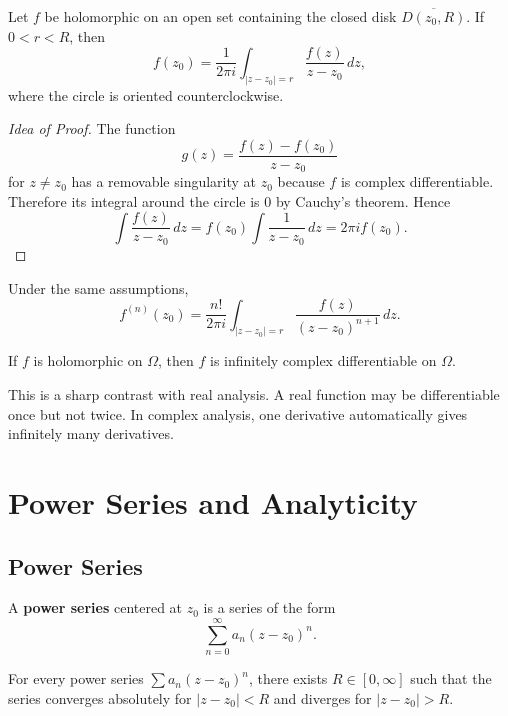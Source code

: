 \begin{theorem}
Let $f$ be holomorphic on an open set containing the closed disk $\overline{D(z_0,R)}$. If $0<r<R$, then
\[
    f(z_0)=\frac{1}{2\pi i}\int_{|z-z_0|=r}\frac{f(z)}{z-z_0}\,dz,
\]
where the circle is oriented counterclockwise.
\end{theorem}

\begin{proof}[Idea of Proof]
The function
\[
    g(z)=\frac{f(z)-f(z_0)}{z-z_0}
\]
for $z\neq z_0$ has a removable singularity at $z_0$ because $f$ is complex differentiable. Therefore its integral around the circle is $0$ by Cauchy's theorem. Hence
\[
    \int\frac{f(z)}{z-z_0}\,dz
    =f(z_0)\int\frac{1}{z-z_0}\,dz
    =2\pi i f(z_0).
\]
\end{proof}

\begin{theorem}
Under the same assumptions,
\[
    f^{(n)}(z_0)=\frac{n!}{2\pi i}\int_{|z-z_0|=r}\frac{f(z)}{(z-z_0)^{n+1}}\,dz.
\]
\end{theorem}

\begin{corollary}
If $f$ is holomorphic on $\Omega$, then $f$ is infinitely complex differentiable on $\Omega$.
\end{corollary}

\begin{remark}
This is a sharp contrast with real analysis. A real function may be differentiable once but not twice. In complex analysis, one derivative automatically gives infinitely many derivatives.
\end{remark}

\section{Power Series and Analyticity}

\subsection{Power Series}

\begin{definition}
A \textbf{power series} centered at $z_0$ is a series of the form
\[
    \sum_{n=0}^{\infty}a_n(z-z_0)^n.
\]
\end{definition}

\begin{theorem}
For every power series $\sum a_n(z-z_0)^n$, there exists $R\in[0,\infty]$ such that the series converges absolutely for $|z-z_0|<R$ and diverges for $|z-z_0|>R$.
\end{theorem}

